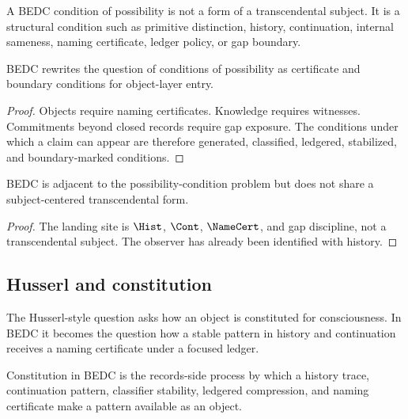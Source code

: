 \begin{definition}
\label{def:philosophy-bedc-condition-possibility}
A BEDC condition of possibility is not a form of a transcendental
subject. It is a structural condition such as primitive distinction,
history, continuation, internal sameness, naming certificate, ledger
policy, or gap boundary.
\end{definition}

\begin{theorem}
\label{thm:philosophy-conditions-become-certificates}
BEDC rewrites the question of conditions of possibility as certificate
and boundary conditions for object-layer entry.
\end{theorem}
\begin{proof}
Objects require naming certificates. Knowledge requires witnesses.
Commitments beyond closed records require gap exposure. The conditions
under which a claim can appear are therefore generated, classified,
ledgered, stabilized, and boundary-marked conditions.
\end{proof}

\begin{corollary}
\label{cor:philosophy-bedc-not-kantianism}
BEDC is adjacent to the possibility-condition problem but does not
share a subject-centered transcendental form.
\end{corollary}
\begin{proof}
The landing site is \(\Hist\), \(\Cont\), \(\NameCert\), and gap
discipline, not a transcendental subject. The observer has already been
identified with history.
\end{proof}

\subsection{Husserl and constitution}
\label{subsec:philosophy-husserl-constitution}

\begin{definition}
\label{def:philosophy-husserlian-question}
The Husserl-style question asks how an object is constituted for
consciousness. In BEDC it becomes the question how a stable pattern in
history and continuation receives a naming certificate under a focused
ledger.
\end{definition}

\begin{definition}
\label{def:philosophy-bedc-constitution}
Constitution in BEDC is the records-side process by which a history
trace, continuation pattern, classifier stability, ledgered
compression, and naming certificate make a pattern available as an
object.
\end{definition}

